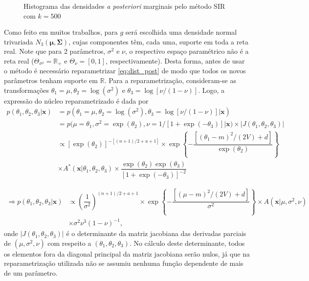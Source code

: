 \begin{figure}[t]
	\caption{Histograma das densidades \textit{a posteriori} marginais pelo método SIR com $k = 500$}%
\end{figure}

Como feito em muitos trabalhos, para $g$ será escolhida uma densidade normal trivariada $N_3(\bm{\mu}, \bm{\Sigma})$, cujas componentes têm, cada uma, suporte em toda a reta real. Note que para 2 parâmetros, $\sigma^2$ e $\nu$, o respectivo espaço paramétrico não é a reta real ($\Theta_{\sigma^2} = \mathbb{R}_+$ e $\Theta_{\nu} = [0,1]$, respectivamente). Desta forma, antes de usar o método é necessário reparametrizar \eqref{eq:dist_post} de modo que todos os novos parâmetros tenham suporte em $\mathbb{R}$. Para a reparametrização, consideram-se as transformações $\theta_1 = \mu, \theta_2 = \log(\sigma^2)$ e $\theta_3 = \log[\nu/(1-\nu)]$. Logo, a expressão do núcleo reparametrizado é dada por
\begin{align}
p(\theta_1, \theta_2, \theta_3 | \bm{x})
&= p(\theta_1 = \mu, \theta_2 = \log(\sigma^2), \theta_3 = \log[\nu/(1-\nu)] | \bm{x}) \nonumber \\
&= p(\mu = \theta_1, \sigma^2 = \exp(\theta_2), \nu = 1/[1 + \exp(-\theta_3)] | \bm{x}) \times |J(\theta_1, \theta_2, \theta_3)| \nonumber \\
&\propto \left[\exp(\theta_2)\right]^{-[(n + 1)/2 + a + 1]} \times \exp\left\{-\dfrac{\left[(\theta_1 - m)^2 / (2V) + d\right]}{\exp(\theta_2)}\right\} \nonumber \\
&\times A^*(\bm{x} | \theta_1, \theta_2, \theta_3) \times  \dfrac{\exp(\theta_2) \exp(\theta_3)}{\left[1 + \exp(-\theta_3)\right]^{-2}} \nonumber
\end{align}

\begin{align}
\Rightarrow p(\theta_1, \theta_2, \theta_3 | \bm{x}) &\propto \left(\dfrac{1}{\sigma^2}\right)^{(n + 1)/2 + a + 1} \times \exp\left\{-\dfrac{\left[(\mu - m)^2 / (2V) + d\right]}{\sigma^2}\right\} \times A(\bm{x} | \mu, \sigma^2, \nu) \nonumber \\
&\times \sigma^2 \nu^3(1-\nu)^{-1}, \label{eq:sir_dpre}
\end{align}
onde $|J(\theta_1, \theta_2, \theta_3)|$ é o determinante da matriz jacobiana das derivadas parciais de $(\mu, \sigma^2, \nu)$ com respeito a $(\theta_1, \theta_2, \theta_3)$. No cálculo deste determinante, todos os elementos fora da diagonal principal da matriz jacobiana serão nulos, já que na reparametrização utilizada não se assumiu nenhuma função dependente de mais de um parâmetro.


